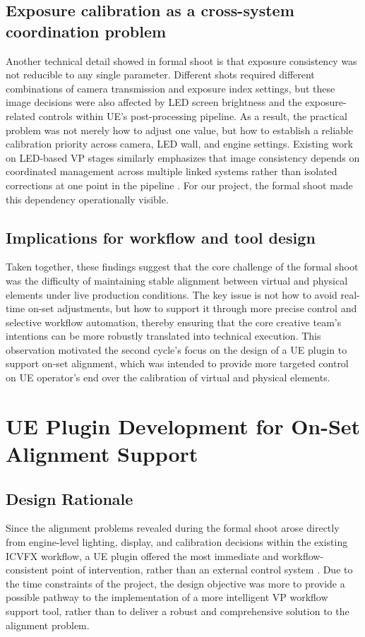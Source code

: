 \documentclass[conference]{IEEEtran}
\begin{document}
\subsection{Exposure calibration as a cross-system coordination problem}
Another technical detail showed in formal shoot is that exposure consistency was not reducible to any single parameter. Different shots required different combinations of camera transmission and exposure index settings, but these image decisions were also affected by LED screen brightness and the exposure-related controls within UE's post-processing pipeline. As a result, the practical problem was not merely how to adjust one value, but how to establish a reliable calibration priority across camera, LED wall, and engine settings. Existing work on LED-based VP stages similarly emphasizes that image consistency depends on coordinated management across multiple linked systems rather than isolated corrections at one point in the pipeline \cite{colorLED,colorreproductionLED}. For our project, the formal shoot made this dependency operationally visible.

\subsection{Implications for workflow and tool design}
Taken together, these findings suggest that the core challenge of the formal shoot was the difficulty of maintaining stable alignment between virtual and physical elements under live production conditions. The key issue is not how to avoid real-time on-set adjustments, but how to support it through more precise control and selective workflow automation, thereby ensuring that the core creative team's intentions can be more robustly translated into technical execution. This observation motivated the second cycle's focus on the design of a UE plugin to support on-set alignment, which was intended to provide more targeted control on UE operator's end over the calibration of virtual and physical elements.


\section{UE Plugin Development for On-Set Alignment Support}
\subsection{Design Rationale}
Since the alignment problems revealed during the formal shoot arose directly from engine-level lighting, display, and calibration decisions within the existing ICVFX workflow, a UE plugin offered the most immediate and workflow-consistent point of intervention, rather than an external control system \cite{EpicICVFXDocs}. Due to the time constraints of the project, the design objective was more to provide a possible pathway to the implementation of a more intelligent VP workflow support tool, rather than to deliver a robust and comprehensive solution to the alignment problem.
\end{document}
